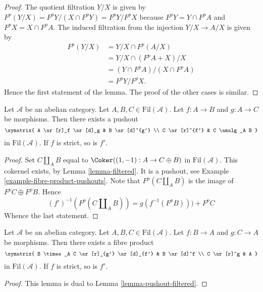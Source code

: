 \begin{proof}
The quotient filtration $Y/X$ is given by
$F^p(Y/X) = F^pY/(X \cap F^pY) = F^pY/F^pX$
because $F^pY = Y \cap F^pA$ and $F^pX = X \cap F^pA$.
The induced filtration from the injection $Y/X \to A/X$ is given by
\begin{align*}
F^p(Y/X) & = Y/X \cap F^p(A/X) \\
& = Y/X \cap (F^pA + X)/X \\
& = (Y \cap F^pA)/(X \cap F^pA) \\
& = F^pY/F^pX.
\end{align*}
Hence the first statement of the lemma.
The proof of the other cases is similar.
\end{proof}

\begin{lemma}
\label{lemma-pushout-filtered}
Let $\mathcal{A}$ be an abelian category.
Let $A, B, C \in \text{Fil}(\mathcal{A})$.
Let $f : A \to B$ and $g : A \to C$ be morphisms.
Then there exists a pushout
$$
\xymatrix{
A \ar[r]_f \ar[d]_g & B \ar[d]^{g'} \\
C \ar[r]^{f'} & C \amalg_A B
}
$$
in $\text{Fil}(\mathcal{A})$. If $f$ is strict, so is $f'$.
\end{lemma}

\begin{proof}
Set $C \amalg_A B$ equal to $\Coker((1, -1) : A \to C \oplus B)$
in $\text{Fil}(\mathcal{A})$. This cokernel exists, by
Lemma \ref{lemma-filtered}.
It is a pushout, see
Example \ref{example-fibre-product-pushouts}.
Note that $F^p(C \amalg_A B)$ is the image of $F^pC \oplus F^pB$.
Hence
$$
(f')^{-1}(F^p(C \amalg_A B)) = g(f^{-1}(F^pB))) + F^pC
$$
Whence the last statement.
\end{proof}

\begin{lemma}
\label{lemma-fibre-product-filtered}
Let $\mathcal{A}$ be an abelian category.
Let $A, B, C \in \text{Fil}(\mathcal{A})$.
Let $f : B \to A$ and $g : C \to A$ be morphisms.
Then there exists a fibre product
$$
\xymatrix{
B \times_A C \ar[r]_{g'} \ar[d]_{f'} & B \ar[d]^f \\
C \ar[r]^g & A
}
$$
in $\text{Fil}(\mathcal{A})$. If $f$ is strict, so is $f'$.
\end{lemma}

\begin{proof}
This lemma is dual to
Lemma \ref{lemma-pushout-filtered}.
\end{proof}

